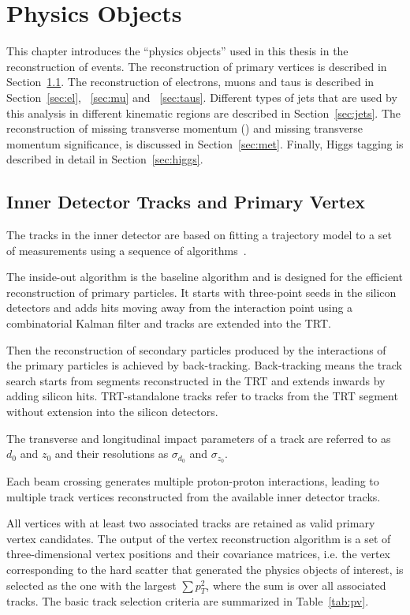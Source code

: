 \chapter{Physics Objects}

\label{ch:objects}

\par This chapter introduces the ``physics objects'' used in this thesis in the reconstruction of events. The reconstruction of primary vertices is described in Section~\ref{sec:pv}. 
The reconstruction of electrons, muons and taus is described in Section~\ref{sec:el}, ~\ref{sec:mu} and ~\ref{sec:taus}.
Different types of jets that are used by this analysis in different kinematic regions are described in Section~\ref{sec:jets}. 
The reconstruction of missing transverse momentum (\met) and missing transverse momentum significance, is discussed in Section~\ref{sec:met}. 
Finally, Higgs tagging is described in detail in Section~\ref{sec:higgs}.

\section{Inner Detector Tracks and Primary Vertex}
\label{sec:pv}

\par The tracks in the inner detector are based on fitting a trajectory model to a set of measurements using a sequence of algorithms~\cite{Cornelissen:1020106}.
\par The inside-out algorithm is the baseline algorithm and is designed for the efficient reconstruction of primary particles. 
It starts with three-point seeds in the silicon detectors and adds hits moving away from the interaction point using a combinatorial Kalman filter and tracks are extended into the TRT.
\par Then the reconstruction of secondary particles produced by the interactions of the primary particles is achieved by back-tracking. 
Back-tracking means the track search starts from segments reconstructed in the TRT and extends inwards by adding silicon hits. 
TRT-standalone tracks refer to tracks from the TRT segment without extension into the silicon detectors.                    
\par The transverse and longitudinal impact parameters of a track are referred to as $d_0$ and $z_0$ and their resolutions as $\sigma_{d_0}$ 
and $\sigma_{z_0}$. 
\par Each beam crossing generates multiple proton-proton interactions, leading to multiple track vertices reconstructed from the available inner detector tracks.
\par All vertices with at least two associated tracks are retained as valid primary vertex candidates. 
The output of the vertex reconstruction algorithm is a set of three-dimensional vertex positions and their covariance matrices, i.e. the vertex corresponding to the hard scatter that generated the physics objects of interest, is selected as the one with the largest $\sum p_T^2$, where the sum is over all associated tracks. 
The basic track selection criteria are summarized in Table~\ref{tab:pv}.

